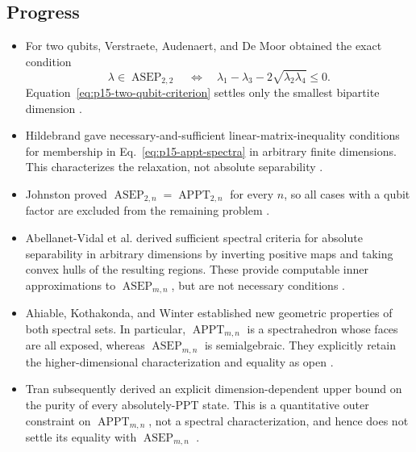\subsection*{Progress}

\begin{itemize}
  \item For two qubits, Verstraete, Audenaert, and De Moor obtained the exact
  condition
  \begin{equation}
    \lambda\in\operatorname{ASEP}_{2,2}
    \quad\Longleftrightarrow\quad
    \lambda_1-\lambda_3-2\sqrt{\lambda_2\lambda_4}\le0.
    \label{eq:p15-two-qubit-criterion}
  \end{equation}
  Equation~\eqref{eq:p15-two-qubit-criterion} settles only the smallest
  bipartite dimension
  .

  \item Hildebrand gave necessary-and-sufficient linear-matrix-inequality
  conditions for membership in Eq.~\eqref{eq:p15-appt-spectra} in arbitrary
  finite dimensions.  This characterizes the relaxation, not absolute
  separability
  .

  \item Johnston proved
  $\operatorname{ASEP}_{2,n}=\operatorname{APPT}_{2,n}$ for every $n$, so all
  cases with a qubit factor are excluded from the remaining problem
  .

  \item Abellanet-Vidal et al. derived sufficient spectral criteria for
  absolute separability in arbitrary dimensions by inverting positive maps
  and taking convex hulls of the resulting regions.  These provide
  computable inner approximations to
  $\operatorname{ASEP}_{m,n}$, but are not necessary conditions
  .

  \item Ahiable, Kothakonda, and Winter established new geometric properties
  of both spectral sets.  In particular, $\operatorname{APPT}_{m,n}$ is a
  spectrahedron whose faces are all exposed, whereas
  $\operatorname{ASEP}_{m,n}$ is semialgebraic.  They explicitly retain the
  higher-dimensional characterization and equality as open
  .

  \item Tran subsequently derived an explicit dimension-dependent upper
  bound on the purity of every absolutely-PPT state.  This is a quantitative
  outer constraint on $\operatorname{APPT}_{m,n}$, not a spectral
  characterization, and hence does not settle its equality with
  $\operatorname{ASEP}_{m,n}$
  .
\end{itemize}

